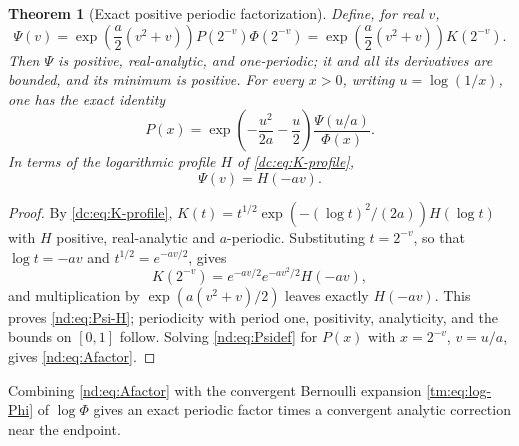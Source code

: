 \documentclass[11pt,a4paper,oneside,openany]{book}
\numberwithin{equation}{chapter}
\newtheorem{theorem}{Theorem}[chapter]
\theoremstyle{definition}
\theoremstyle{remark}
\begin{document}
\begin{theorem}[Exact positive periodic factorization]\label{nd:thm:periodic}
Define, for real $v$,
\begin{equation}\label{nd:eq:Psidef}
 \Psi(v)=\exp\!\left(\frac a2(v^2+v)\right)P(2^{-v})\Phi(2^{-v})
       =\exp\!\left(\frac a2(v^2+v)\right)K(2^{-v}).
\end{equation}
Then $\Psi$ is positive, real-analytic, and one-periodic; it and all its
derivatives are bounded, and its minimum is positive. For every $x>0$,
writing $u=\log(1/x)$, one has the exact identity
\begin{equation}\label{nd:eq:Afactor}
 P(x)=\exp\!\left(-\frac{u^2}{2a}-\frac u2\right)
      \frac{\Psi(u/a)}{\Phi(x)}.
\end{equation}
In terms of the logarithmic profile $H$ of \eqref{dc:eq:K-profile},
\begin{equation}\label{nd:eq:Psi-H}
 \Psi(v)=H(-av).
\end{equation}
\end{theorem}
\begin{proof}
By \eqref{dc:eq:K-profile}, $K(t)=t^{1/2}\exp(-(\log t)^2/(2a))H(\log t)$
with $H$ positive, real-analytic and $a$-periodic. Substituting $t=2^{-v}$,
so that $\log t=-av$ and $t^{1/2}=e^{-av/2}$, gives
\[
 K(2^{-v})=e^{-av/2}e^{-av^2/2}H(-av),
\]
and multiplication by $\exp(a(v^2+v)/2)$ leaves exactly $H(-av)$. This
proves \eqref{nd:eq:Psi-H}; periodicity with period one, positivity,
analyticity, and the bounds on $[0,1]$ follow. Solving \eqref{nd:eq:Psidef}
for $P(x)$ with $x=2^{-v}$, $v=u/a$, gives \eqref{nd:eq:Afactor}.
\end{proof}
Combining \eqref{nd:eq:Afactor} with the convergent Bernoulli expansion
\eqref{tm:eq:log-Phi} of $\log\Phi$ gives an exact periodic factor times a
convergent analytic correction near the endpoint.


\end{document}
